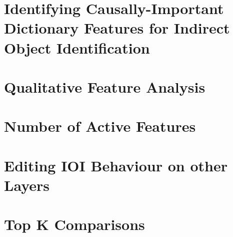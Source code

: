 \documentclass{article}
\begin{document}

\section{Identifying Causally-Important Dictionary Features for Indirect Object Identification}
\label{section:identifying_causal_features}


\section{Qualitative Feature Analysis}
\label{appendix:feature_interp_examples}


\section{Number of Active Features}
\label{appendix:n_features_active}


% 




\section{Editing IOI Behaviour on other Layers}
\label{appendix:ioi_other_layers}


\section{Top K Comparisons}
\label{appendix:topk}



\end{document}
